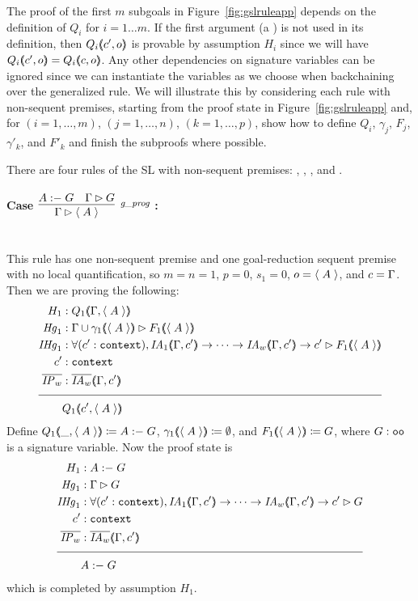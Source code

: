 The proof of the first $m$ subgoals in Figure~\ref{fig:gslruleapp} depends on the definition of $Q_i$ for $i = 1 \ldots m$. If the first argument (a ) is not used in its definition, then $Q_i (\hspace{-0.35em} \langle c'{} , o \rangle \hspace{-0.35em})$ is provable by assumption $H_i$ since we will have $Q_i (\hspace{-0.35em} \langle c'{} , o \rangle \hspace{-0.35em}) = Q_i (\hspace{-0.35em} \langle c , o \rangle \hspace{-0.35em})$. Any other dependencies on signature variables can be ignored since we can instantiate the variables as we choose when backchaining over the generalized rule. We will illustrate this by considering each rule with non-sequent premises, starting from the proof state in Figure~\ref{fig:gslruleapp} and, for $(i = 1 , \ldots , m)$, $(j = 1 , \ldots , n)$, $(k = 1 , \ldots , p)$, show how to define $Q_i$, $\gamma_j$, $F_j$, $\gamma'_k$, and $F'_k$ and finish the subproofs where possible.

There are four rules of the SL with non-sequent premises: \rlnmsbc{}, \rlnmsinit{}, \rlnmssome{}, and \rlnmball{}.

\paragraph{Case $\vcenter{\rlsbc{}}$ :} ~\\

This rule has one non-sequent premise and one goal-reduction sequent premise with no local quantification, so $m = n = 1$, $p = 0$, $s_1 = 0$, $o = \langle \; A \; \rangle$, and $c = \Gamma{}$. Then we are proving the following:
\begin{align*}
H_1 &: Q_1 \args{\dyncon{} , \atom{A}} \\
\mathit{Hg}_1 &: \seqsl[\dyncon{} \cup \gamma_1 \args{\atom{A}}]{F_1 \args{\atom{A}}} \\
\mathit{IHg}_1 &: \forall (\inddyncon{} : \sltm{context}), \mathit{IA}_1 \args{\dyncon{} , \inddyncon{}} \rightarrow \dots \rightarrow \mathit{IA}_w \args{\dyncon{} , \inddyncon{}} \rightarrow \seqsl[\inddyncon{}]{F_1 \args{\atom{A}}} \\
\inddyncon{} &: \sltm{context} \\
\ol{\mathit{IP}_w} &: \ol{\mathit{IA}_w} \args{\dyncon{} , \inddyncon{}} \\[\pfshift{}]
\cline{1-2}
& Q_1 \args{\inddyncon{} , \atom{A}}
\end{align*}
Define $Q_1 (\hspace{-0.35em} \langle \_ , \langle \; A \; \rangle \rangle \hspace{-0.35em}) \coloneqq A \; {:} {-} \; G$, $\gamma_1 (\hspace{-0.35em} \langle \langle \; A \; \rangle \rangle \hspace{-0.35em}) \coloneqq \emptyset$, and $F_1 (\hspace{-0.35em} \langle \langle \; A \; \rangle \rangle \hspace{-0.35em}) \coloneqq G$, where $G : \texttt{oo}$ is a signature variable. Now the proof state is
\begin{align*}
H_1 &: \prog{A}{G} \\
\mathit{Hg}_1 &: \seqsl{G} \\
\mathit{IHg}_1 &: \forall (\inddyncon{} : \sltm{context}), \mathit{IA}_1 \args{\dyncon{} , \inddyncon{}} \rightarrow \dots \rightarrow \mathit{IA}_w \args{\dyncon{} , \inddyncon{}} \rightarrow \seqsl[\inddyncon{}]{G} \\
\inddyncon{} &: \sltm{context} \\
\ol{\mathit{IP}_w} &: \ol{\mathit{IA}_w} \args{\dyncon{} , \inddyncon{}} \\[\pfshift{}]
\cline{1-2}
& \prog{A}{G}
\end{align*}
which is completed by assumption $H_1$.

